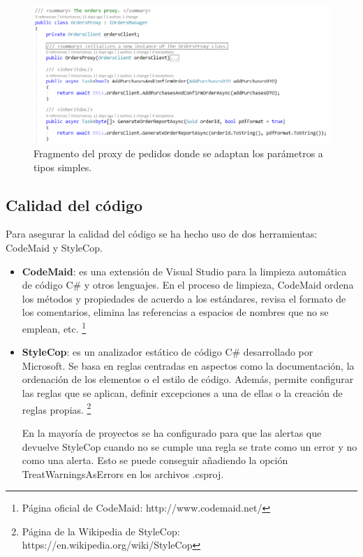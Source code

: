 \documentclass[11pt,spanish,listoffigures]{tfgetsinf}
\begin{document}
\begin{figure}[h]
\centering
\includegraphics[scale=0.7]{OrdersProxy}
\caption{Fragmento del proxy de pedidos donde se adaptan los parámetros a tipos simples.}
\end{figure}

\subsection{Calidad del código}

Para asegurar la calidad del código se ha hecho uso de dos herramientas: CodeMaid y StyleCop.

\begin{itemize}

\item \textbf{CodeMaid}: es una extensión de Visual Studio para la limpieza automática de código C\# y otros lenguajes. En el proceso de limpieza, CodeMaid ordena los métodos y propiedades de acuerdo a los estándares, revisa el formato de los comentarios, elimina las referencias a espacios de nombres que no se emplean, etc. \footnote{ Página oficial de CodeMaid: http://www.codemaid.net/}

\item \textbf{StyleCop}: es un analizador estático de código C\# desarrollado por Microsoft. Se basa en reglas centradas en aspectos como la documentación, la ordenación de los elementos o el estilo de código. Además, permite configurar las reglas que se aplican, definir excepciones a una de ellas o la creación de reglas propias. \footnote{Página de la Wikipedia de StyleCop: https://en.wikipedia.org/wiki/StyleCop} 

En la mayoría de proyectos se ha configurado para que las alertas que devuelve StyleCop cuando no se cumple una regla se trate como un error y no como una alerta. Esto se puede conseguir añadiendo la opción TreatWarningsAsErrors en los archivos .csproj.

\end{itemize}
\end{document}
